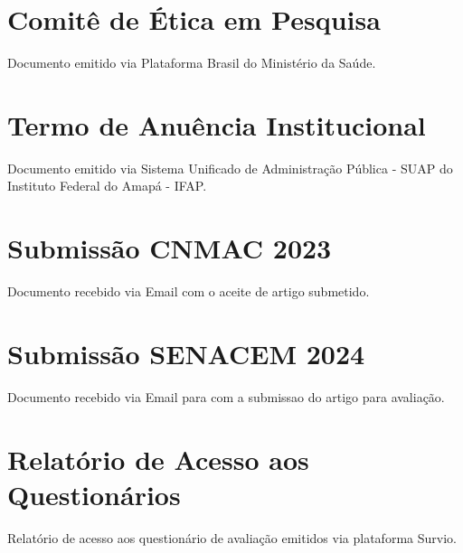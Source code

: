 
\begin{anexosenv}
\partanexos   %

\chapter{Comitê de Ética em Pesquisa}
\begin{center}
    Documento emitido via Plataforma Brasil do Ministério da Saúde.    
\end{center}




\chapter{Termo de Anuência Institucional}
\begin{center}
    Documento emitido via Sistema Unificado de Administração Pública - SUAP do Instituto Federal do Amapá - IFAP.    
\end{center}



\chapter{Submissão CNMAC 2023}
\begin{center}
    Documento recebido via Email com o aceite de artigo submetido.    
\end{center}



\chapter{Submissão SENACEM 2024}
\begin{center}
    Documento recebido via Email para com a submissao do artigo para avaliação.    
\end{center}



\chapter{Relatório de Acesso aos Questionários }
\begin{center}
    Relatório de acesso aos questionário de avaliação emitidos via plataforma Survio.
\end{center}


\end{anexosenv}
